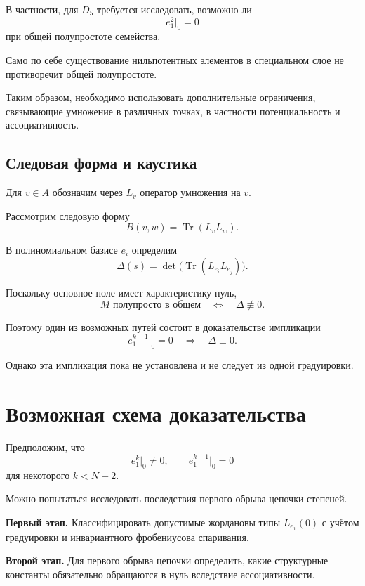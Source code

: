 В частности, для $D_5$ требуется исследовать,
возможно ли
\[
e_1^2\big|_0=0
\]
при общей полупростоте семейства.

Само по себе существование нильпотентных
элементов в специальном слое не противоречит
общей полупростоте.

Таким образом, необходимо использовать
дополнительные ограничения, связывающие
умножение в различных точках, в частности
потенциальность и ассоциативность.

\subsection{Следовая форма и каустика}

Для $v\in A$ обозначим через $L_v$
оператор умножения на $v$.

Рассмотрим следовую форму
\[
B(v,w)=\operatorname{Tr}(L_vL_w).
\]

В полиномиальном базисе $e_i$
определим
\[
\Delta(s)=
\det\bigl(
\operatorname{Tr}(L_{e_i}L_{e_j})
\bigr).
\]

Поскольку основное поле имеет
характеристику нуль,
\[
\boxed{
	M\text{ полупросто в общем}
	\quad\Longleftrightarrow\quad
	\Delta\not\equiv0.
}
\]

Поэтому один из возможных путей состоит
в доказательстве импликации
\[
e_1^{k+1}\big|_0=0
\quad\Longrightarrow\quad
\Delta\equiv0.
\]

Однако эта импликация пока не установлена
и не следует из одной градуировки.

\section{Возможная схема доказательства}

Предположим, что
\[
e_1^k\big|_0\neq0,
\qquad
e_1^{k+1}\big|_0=0
\]
для некоторого $k<N-2$.

Можно попытаться исследовать последствия
первого обрыва цепочки степеней.

\medskip

\noindent
\textbf{Первый этап.}
Классифицировать допустимые жордановы
типы $L_{e_1}(0)$ с учётом градуировки
и инвариантного фробениусова спаривания.

\medskip

\noindent
\textbf{Второй этап.}
Для первого обрыва цепочки определить,
какие структурные константы обязательно
обращаются в нуль вследствие ассоциативности.

\medskip

